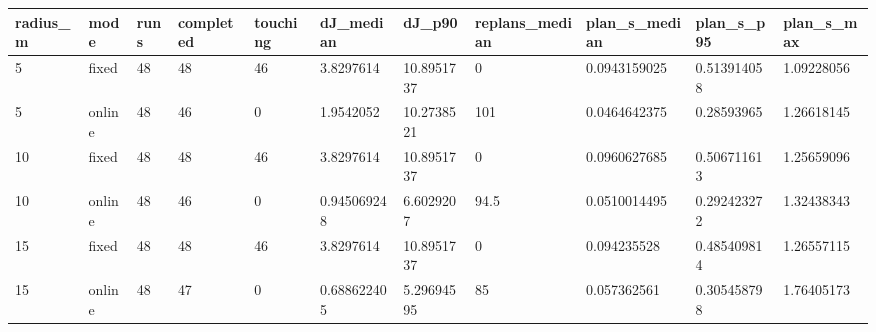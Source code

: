 \begin{tabular}{lllllllllll}
\hline
radius\_m & mode & runs & completed & touching & dJ\_median & dJ\_p90 & replans\_median & plan\_s\_median & plan\_s\_p95 & plan\_s\_max \\
\hline
5 & fixed & 48 & 48 & 46 & 3.8297614 & 10.8951737 & 0 & 0.0943159025 & 0.513914058 & 1.09228056 \\
5 & online & 48 & 46 & 0 & 1.9542052 & 10.2738521 & 101 & 0.0464642375 & 0.28593965 & 1.26618145 \\
10 & fixed & 48 & 48 & 46 & 3.8297614 & 10.8951737 & 0 & 0.0960627685 & 0.506711613 & 1.25659096 \\
10 & online & 48 & 46 & 0 & 0.945069248 & 6.6029207 & 94.5 & 0.0510014495 & 0.292423272 & 1.32438343 \\
15 & fixed & 48 & 48 & 46 & 3.8297614 & 10.8951737 & 0 & 0.094235528 & 0.485409814 & 1.26557115 \\
15 & online & 48 & 47 & 0 & 0.688622405 & 5.29694595 & 85 & 0.057362561 & 0.305458798 & 1.76405173 \\
\hline
\end{tabular}
